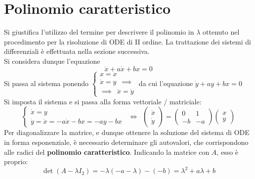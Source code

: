 \documentclass[10pt, oneside]{book}
\theoremstyle{plain}
\begin{document}
\section{Polinomio caratteristico}
Si giustifica l'utilizzo del termine per descrivere il polinomio in $\lambda$ ottenuto nel procedimento per la risoluzione di ODE di II ordine. La trattazione dei sistemi di differenziali è effettuata nella sezione successiva.
\\Si considera dunque l'equazione
\[\ddot{x} + a \dot{x} + b x = 0\]
Si passa al sistema ponendo $\displaystyle \begin{cases}
x = x\\
\dot{x} = y \enspace \implies\\
\implies \enspace \ddot{x} = \dot{y}
\end{cases}$ da cui l'equazione $\dot{y} + a y + b x = 0$
\\Si imposta il sistema e si passa alla forma vettoriale / matriciale:
\[\begin{cases}
\dot{x} = y\\
\dot{y} = \ddot{x} = - a \dot{x} - b x = - a y - b x
\end{cases} \enspace \Leftrightarrow \enspace \begin{pmatrix}
\dot{x} \\
\dot{y}
\end{pmatrix} = \begin{pmatrix}
0 & 1 \\
- b & - a
\end{pmatrix} \begin{pmatrix}
x \\ y
\end{pmatrix}\]
Per diagonalizzare la matrice, e dunque ottenere la soluzione del sistema di ODE in forma esponenziale, è necessario determinare gli autovalori, che corrispondono alle radici del \textbf{polinomio caratteristico}. Indicando la matrice con $A$, esso è proprio:
\[\det(A - \lambda I_2) = - \lambda ( - a - \lambda) - (-b) = \lambda^2 + a \lambda + b\]
\end{document}
